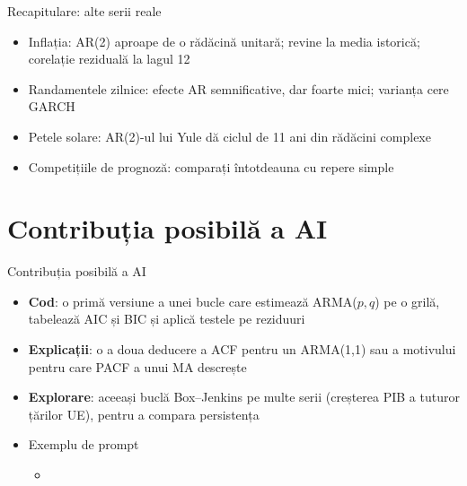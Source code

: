 \begin{frame}{Recapitulare: alte serii reale}
\itemsize{\small}
\begin{itemize}
    \item Inflația: AR(2) aproape de o rădăcină unitară; revine la media istorică; corelație reziduală la lagul 12
    \item Randamentele zilnice: efecte AR semnificative, dar foarte mici; varianța cere GARCH
    \item Petele solare: AR(2)-ul lui Yule dă ciclul de 11 ani din rădăcini complexe
    \item Competițiile de prognoză: comparați întotdeauna cu repere simple
\end{itemize}
\end{frame}


\section{Contribuția posibilă a AI}

\begin{frame}{Contribuția posibilă a AI}
\itemsize{\small}
\begin{itemize}
    \item \textbf{Cod}: o primă versiune a unei bucle care estimează ARMA($p,q$) pe o grilă, tabelează AIC și BIC și aplică testele pe reziduuri
    \item \textbf{Explicații}: o a doua deducere a ACF pentru un ARMA(1,1) sau a motivului pentru care PACF a unui MA descrește
    \item \textbf{Explorare}: aceeași buclă Box--Jenkins pe multe serii (creșterea PIB a tuturor țărilor UE), pentru a compara persistența
    \item Exemplu de prompt
    \begin{itemize}
        \item {}
    \end{itemize}
\end{itemize}
\end{frame}

